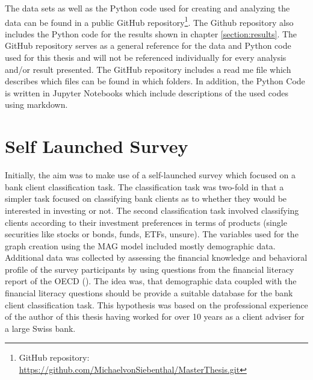   \noindent The data sets as well as the Python code used for creating and 
  analyzing the data can be found in a public GitHub repository\footnote{GitHub
  repository: \url{https://github.com/MichaelvonSiebenthal/MasterThesis.git}}. 
  The Github repository also includes the Python code for the results shown in
  chapter \ref{section:results}. The GitHub repository serves as a general 
  reference for the data and Python code used for this thesis and will not be 
  referenced individually for every analysis and/or result presented. The GitHub 
  repository includes a read me file which describes which files can be 
  found in which folders. In addition, the Python Code is written in 
  Jupyter Notebooks which include descriptions of the used codes using markdown.

  \section{Self Launched Survey}
  \label{section:self_survey} 

  Initially, the aim was to make use of a self-launched survey which focused on
  a bank client classification task. The classification task was two-fold in 
  that a simpler task focused on classifying bank clients as to whether they 
  would be interested in investing or not. The second classification task
  involved classifying clients according to their investment preferences in
  terms of products (single securities like stocks or bonds, funds, ETFs,
  unsure). The variables used for the graph creation using the MAG model
  included mostly demographic data. Additional data was collected by assessing
  the financial knowledge and behavioral profile of the survey participants by 
  using questions from the financial literacy report of the OECD
  (\citeyear{OECD2017}). The idea was, that demographic data coupled with the 
  financial literacy questions should be provide a suitable database for the bank 
  client classification task. This hypothesis was based on the professional 
  experience of the author of this thesis having worked for over 10 years as a 
  client adviser for a large Swiss bank. \\

